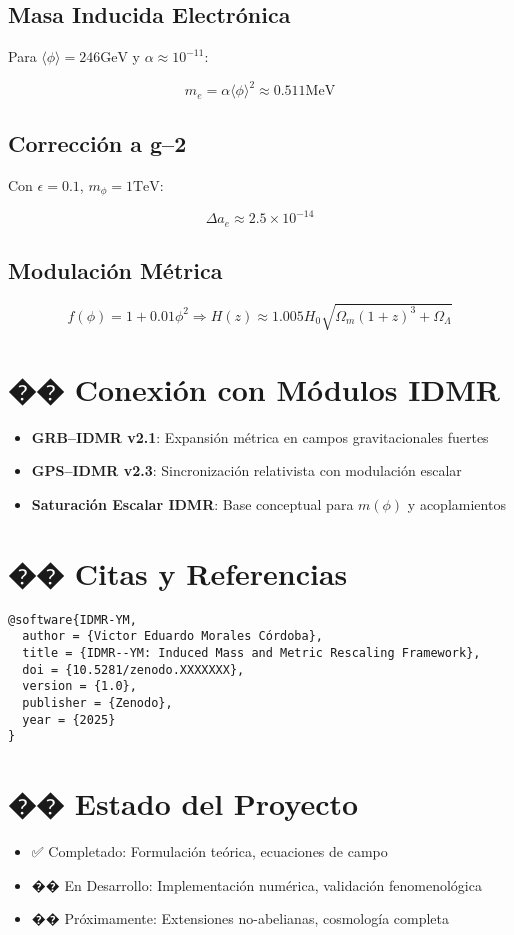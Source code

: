 \documentclass[12pt]{article}
\begin{document}
\subsection*{Masa Inducida Electrónica}
Para \( \langle\phi\rangle = 246 \text{GeV} \) y \( \alpha \approx 10^{-11} \):


\[
m_e = \alpha\langle\phi\rangle^2 \approx 0.511 \text{MeV}
\]



\subsection*{Corrección a g--2}
Con \( \epsilon = 0.1 \), \( m_\phi = 1 \text{TeV} \):


\[
\Delta a_e \approx 2.5\times 10^{-14}
\]



\subsection*{Modulación Métrica}


\[
f(\phi) = 1 + 0.01\phi^2 \Rightarrow H(z) \approx 1.005H_0\sqrt{\Omega_m(1+z)^3 + \Omega_\Lambda}
\]



\section*{�� Conexión con Módulos IDMR}
\begin{itemize}
  \item \textbf{GRB--IDMR v2.1}: Expansión métrica en campos gravitacionales fuertes
  \item \textbf{GPS--IDMR v2.3}: Sincronización relativista con modulación escalar
  \item \textbf{Saturación Escalar IDMR}: Base conceptual para \( m(\phi) \) y acoplamientos
\end{itemize}

\section*{�� Citas y Referencias}
\begin{verbatim}
@software{IDMR-YM,
  author = {Victor Eduardo Morales Córdoba},
  title = {IDMR--YM: Induced Mass and Metric Rescaling Framework},
  doi = {10.5281/zenodo.XXXXXXX},
  version = {1.0},
  publisher = {Zenodo},
  year = {2025}
}
\end{verbatim}

\section*{�� Estado del Proyecto}
\begin{itemize}
  \item ✅ Completado: Formulación teórica, ecuaciones de campo
  \item �� En Desarrollo: Implementación numérica, validación fenomenológica
  \item �� Próximamente: Extensiones no-abelianas, cosmología completa
\end{itemize}
\end{document}
